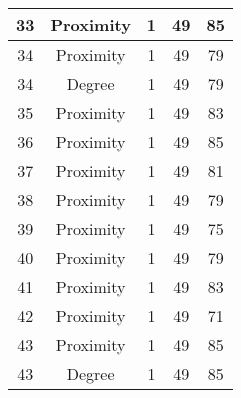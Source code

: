 \documentclass[results.tex]{subfiles}
\begin{document}
\begin{center}
\begin{tabular}{| c || c | c | c | c |}
            \hline
            33                      & Proximity                    & 1                      & 49                      & 85                   \\
            \hline
            34                      & Proximity                    & 1                      & 49                      & 79                   \\
            \hline
            34                      & Degree                       & 1                      & 49                      & 79                   \\
            \hline
            35                      & Proximity                    & 1                      & 49                      & 83                   \\
            \hline
            36                      & Proximity                    & 1                      & 49                      & 85                   \\
            \hline
            37                      & Proximity                    & 1                      & 49                      & 81                   \\
            \hline
            38                      & Proximity                    & 1                      & 49                      & 79                   \\
            \hline
            39                      & Proximity                    & 1                      & 49                      & 75                   \\
            \hline
            40                      & Proximity                    & 1                      & 49                      & 79                   \\
            \hline
            41                      & Proximity                    & 1                      & 49                      & 83                   \\
            \hline
            42                      & Proximity                    & 1                      & 49                      & 71                   \\
            \hline
            43                      & Proximity                    & 1                      & 49                      & 85                   \\
            \hline
            43                      & Degree                       & 1                      & 49                      & 85                   \\

\end{tabular}
\end{center}
\end{document}
